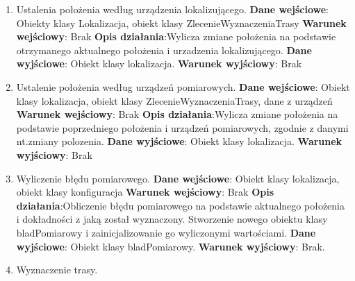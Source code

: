 \documentclass[11pt]{article}
\begin{document}
\begin{enumerate}
\begin{enumerate}[label*=\arabic*.]
			\begin{enumerate}[label*=\arabic*.]
				\item Ustalenia położenia według urządzenia lokalizującego. \newline
				\textbf{Dane wejściowe}: Obiekty klasy Lokalizacja, obiekt klasy ZlecenieWyznaczeniaTrasy	\newline
				\textbf{Warunek wejściowy}: Brak		\newline   	
				\textbf{Opis działania}:\newline Wylicza zmiane położenia na podstawie otrzymanego aktualnego położenia i urzadzenia lokalizującego.	\newline
				\textbf{Dane wyjściowe}: Obiekt klasy lokalizacja.	\newline
				\textbf{Warunek wyjściowy}: Brak
				\item Ustalenie położenia według urządzeń pomiarowych. \newline
				\textbf{Dane wejściowe}: Obiekt klasy lokalizacja, obiekt klasy ZlecenieWyznaczeniaTrasy, dane z urządzeń	\newline
				\textbf{Warunek wejściowy}: Brak		\newline   	
				\textbf{Opis działania}:\newline Wylicza zmiane położenia na podstawie poprzedniego położenia i urządzeń pomiarowych, zgodnie z danymi nt.zmiany polozenia.	\newline
				\textbf{Dane wyjściowe}: Obiekt klasy lokalizacja.	\newline
				\textbf{Warunek wyjściowy}: Brak
				\item Wyliczenie błędu pomiarowego. \newline
				\textbf{Dane wejściowe}: Obiekt klasy lokalizacja, obiekt klasy konfiguracja	\newline
				\textbf{Warunek wejściowy}: Brak		\newline   	
				\textbf{Opis działania}:\newline Obliczenie błędu pomiarowego na podstawie aktualnego położenia i dokładności z jaką został wyznaczony. \newline Stworzenie nowego obiektu klasy bladPomiarowy i zainicjalizowanie go wyliczonymi wartościami.	\newline
				\textbf{Dane wyjściowe}: Obiekt klasy bladPomiarowy.	\newline
				\textbf{Warunek wyjściowy}: Brak.
				\item Wyznaczenie trasy. \newline

\end{enumerate}
\end{enumerate}
\end{enumerate}
\end{document}
